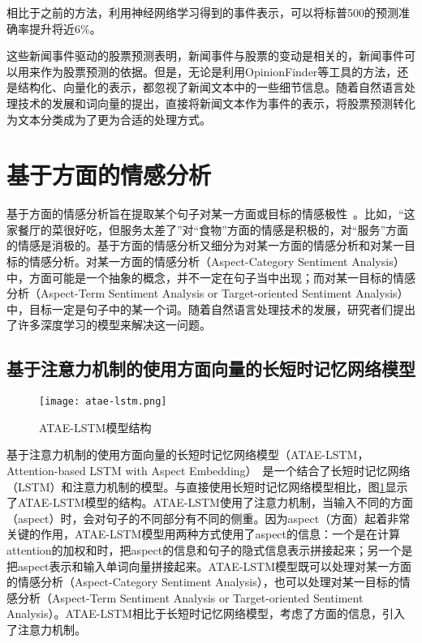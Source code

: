相比于之前的方法，利用神经网络学习得到的事件表示，可以将标普500的预测准确率提升将近6\%。

这些新闻事件驱动的股票预测表明，新闻事件与股票的变动是相关的，新闻事件可以用来作为股票预测的依据。但是，无论是利用OpinionFinder等工具的方法，还是结构化、向量化的表示，都忽视了新闻文本中的一些细节信息。随着自然语言处理技术的发展和词向量的提出，直接将新闻文本作为事件的表示，将股票预测转化为文本分类成为了更为合适的处理方式。

\section{基于方面的情感分析}

基于方面的情感分析旨在提取某个句子对某一方面或目标的情感极性~\cite{pontiki2014semeval-2014}。比如，“这家餐厅的菜很好吃，但服务太差了”对“食物”方面的情感是积极的，对“服务”方面的情感是消极的。基于方面的情感分析又细分为对某一方面的情感分析和对某一目标的情感分析。对某一方面的情感分析（Aspect-Category Sentiment Analysis）中，方面可能是一个抽象的概念，并不一定在句子当中出现；而对某一目标的情感分析（Aspect-Term Sentiment Analysis or Target-oriented Sentiment Analysis）中，目标一定是句子中的某一个词。随着自然语言处理技术的发展，研究者们提出了许多深度学习的模型来解决这一问题。

\subsection{基于注意力机制的使用方面向量的长短时记忆网络模型}

\begin{figure}[ht]
    \centering 
    \texttt{[image: atae-lstm.png]}
    \caption{ATAE-LSTM模型结构}
    \label{fig:atae-lstm}
\end{figure}

基于注意力机制的使用方面向量的长短时记忆网络模型（ATAE-LSTM，Attention-based LSTM with Aspect Embedding）~\cite{wang2016attention-based}是一个结合了长短时记忆网络（LSTM）\cite{hochreiter1997long}和注意力机制的模型。与直接使用长短时记忆网络模型相比，图\ref{fig:atae-lstm}显示了ATAE-LSTM模型的结构。ATAE-LSTM使用了注意力机制，当输入不同的方面（aspect）时，会对句子的不同部分有不同的侧重。因为aspect（方面）起着非常关键的作用，ATAE-LSTM模型用两种方式使用了aspect的信息：一个是在计算attention的加权和时，把aspect的信息和句子的隐式信息表示拼接起来；另一个是把aspect表示和输入单词向量拼接起来。ATAE-LSTM模型既可以处理对某一方面的情感分析（Aspect-Category Sentiment Analysis），也可以处理对某一目标的情感分析（Aspect-Term Sentiment Analysis or Target-oriented Sentiment Analysis）。ATAE-LSTM相比于长短时记忆网络模型，考虑了方面的信息，引入了注意力机制。


